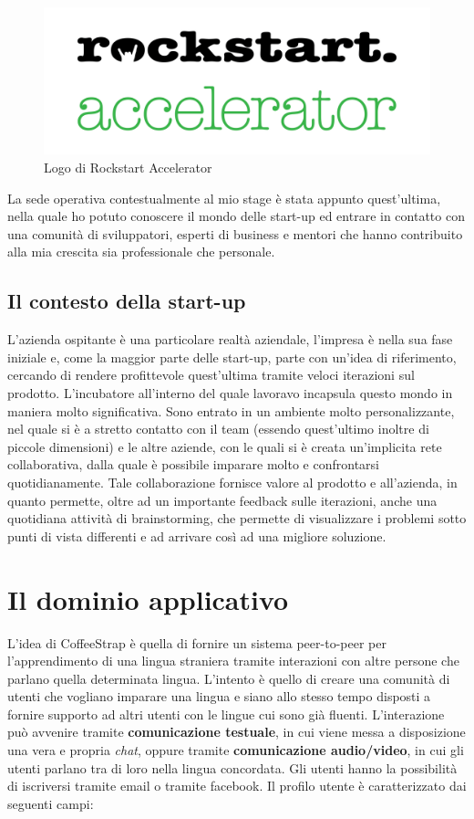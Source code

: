 \begin{figure}[htpd]
\centering
\includegraphics[width=\textwidth/2]{../immagini/rockstart-logo}
\caption{Logo di Rockstart Accelerator}
\end{figure} 

La sede operativa contestualmente al mio stage è stata appunto quest'ultima, nella quale ho potuto conoscere il mondo delle start-up ed entrare in contatto con una comunità di sviluppatori, esperti di business e mentori che hanno contribuito alla mia crescita sia professionale che personale.

\subsection{Il contesto della start-up}

L'azienda ospitante è una particolare realtà aziendale, l'impresa è nella sua fase iniziale e, come la maggior parte delle start-up, parte con un'idea di riferimento, cercando di rendere profittevole quest'ultima tramite veloci iterazioni sul prodotto. L'incubatore all'interno del quale lavoravo incapsula questo mondo in maniera molto significativa. Sono entrato in un ambiente molto personalizzante, nel quale si è a stretto contatto con il team (essendo quest'ultimo inoltre di piccole dimensioni) e le altre aziende, con le quali si è creata un'implicita rete collaborativa, dalla quale è possibile imparare molto e confrontarsi quotidianamente. Tale collaborazione fornisce valore al prodotto e all'azienda, in quanto permette, oltre ad un importante feedback sulle iterazioni, anche una quotidiana attività di \gls{brainstorming}, che permette di visualizzare i problemi sotto punti di vista differenti e ad arrivare così ad una migliore soluzione.

\section{Il dominio applicativo}

L'idea di CoffeeStrap è quella di fornire un sistema \gls{peer-to-peer} per l'apprendimento di una lingua straniera tramite interazioni con altre persone che parlano quella determinata lingua. L'intento è quello di creare una comunità di utenti che vogliano imparare una lingua e siano allo stesso tempo disposti a fornire supporto ad altri utenti con le lingue cui sono già fluenti. L'interazione può avvenire tramite \textbf{comunicazione testuale}, in cui viene messa a disposizione una vera e propria \textit{chat}, oppure tramite \textbf{comunicazione audio/video}, in cui gli utenti parlano tra di loro nella lingua concordata. Gli utenti hanno la possibilità di iscriversi tramite email o tramite facebook. Il profilo utente è caratterizzato dai seguenti campi:

